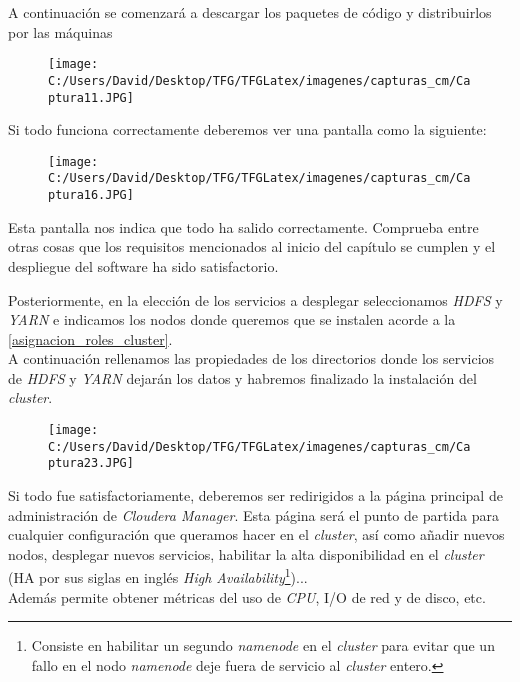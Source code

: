 A continuación se comenzará a descargar los paquetes de código y distribuirlos por las máquinas

\begin{figure}[!htpb]
  \centering
  \texttt{[image: C:/Users/David/Desktop/TFG/TFGLatex/imagenes/capturas\_cm/Captura11.JPG]}
\end{figure}

Si todo funciona correctamente deberemos ver una pantalla como la siguiente:

\begin{figure}[!htpb]
  \centering
  \texttt{[image: C:/Users/David/Desktop/TFG/TFGLatex/imagenes/capturas\_cm/Captura16.JPG]}
\end{figure}

Esta pantalla nos indica que todo ha salido correctamente. Comprueba entre otras cosas que los requisitos
mencionados al inicio del capítulo se cumplen y el despliegue del software ha sido satisfactorio.
\newline

Posteriormente, en la elección de los servicios a desplegar seleccionamos \textit{HDFS} y \textit{YARN} e
indicamos los nodos donde queremos que se instalen acorde a la \autoref{asignacion_roles_cluster}.\\
A continuación rellenamos las propiedades de los directorios donde los servicios de \textit{HDFS} y \textit{YARN}
dejarán los datos y habremos finalizado la instalación del \textit{cluster}.

\begin{figure}[!htpb]
  \centering
  \texttt{[image: C:/Users/David/Desktop/TFG/TFGLatex/imagenes/capturas\_cm/Captura23.JPG]}
\end{figure}

Si todo fue satisfactoriamente, deberemos ser redirigidos a la página principal de administración de
\textit{Cloudera Manager}. Esta página será el punto de partida para cualquier configuración que queramos hacer
en el \textit{cluster}, así como añadir nuevos nodos, desplegar nuevos servicios, habilitar la alta
disponibilidad en el \textit{cluster} (HA por sus siglas en inglés 
\textit{High Availability}\footnote{Consiste en habilitar un segundo \textit{namenode} en el \textit{cluster} 
para evitar que un fallo en el nodo \textit{namenode} deje fuera de servicio al \textit{cluster} entero.})...\\
Además permite obtener métricas del uso de \textit{CPU}, I/O de red y de disco, etc.

